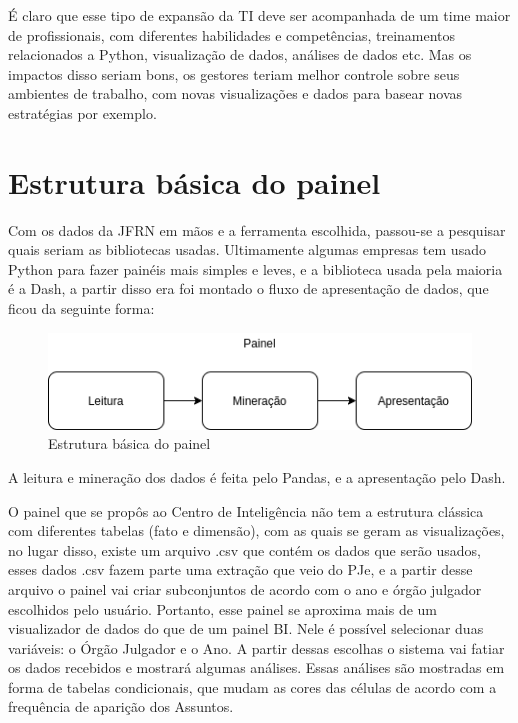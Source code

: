 É claro que esse tipo de expansão da TI deve ser acompanhada de um time maior de profissionais, com diferentes habilidades e competências, treinamentos relacionados a Python, visualização de dados, análises de dados etc. Mas os impactos disso seriam bons, os gestores teriam melhor controle sobre seus ambientes de trabalho, com novas visualizações e dados para basear novas estratégias por exemplo.

\section{Estrutura básica do painel}

Com os dados da JFRN em mãos e a ferramenta escolhida, passou-se a pesquisar quais seriam as bibliotecas usadas. Ultimamente algumas empresas tem usado Python para fazer painéis mais simples e leves, e a biblioteca usada pela maioria é a Dash, a partir disso era foi montado o fluxo de apresentação de dados, que ficou da seguinte forma:

\begin{figure}[h]
	\centering
	\includegraphics[scale=0.65]{./figures/cap2/estrutura_painel.png}
	\caption{Estrutura básica do painel}
\end{figure}

A leitura e mineração dos dados é feita pelo Pandas, e a apresentação pelo Dash. 

O painel que se propôs ao Centro de Inteligência não tem a estrutura clássica com diferentes tabelas (fato e dimensão), com as quais se geram as visualizações, no lugar disso, existe um arquivo .csv que contém os dados que serão usados, esses dados .csv fazem parte uma extração que veio do PJe, e a partir desse arquivo o painel vai criar subconjuntos de acordo com o ano e órgão julgador escolhidos pelo usuário. Portanto, esse painel se aproxima mais de um visualizador de dados do que de um painel BI. Nele é possível selecionar duas variáveis: o Órgão Julgador e o Ano. A partir dessas escolhas o sistema vai fatiar os dados recebidos e mostrará algumas análises. Essas análises são mostradas em forma de tabelas condicionais, que mudam as cores das células de acordo com a frequência de aparição dos Assuntos.

